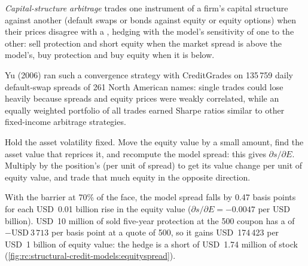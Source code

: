 \begin{definition}\label{def:rc:structural-credit-models:csa}
\emph{Capital-structure arbitrage} trades one
instrument of a firm's capital structure against another (default swaps or bonds
against equity or equity options) when their prices disagree with a ,
hedging with the model's sensitivity of one to the other: sell protection and short
equity when the market spread is above the model's, buy protection and buy equity when
it is below.
\end{definition}
Yu (2006) ran such a convergence strategy with CreditGrades on 135\,759 daily default-swap spreads of 261
North American names: single trades could lose heavily because spreads and equity prices were weakly
correlated, while an equally weighted portfolio of all trades earned Sharpe ratios similar to other
fixed-income arbitrage strategies.


\begin{method}\label{met:rc:structural-credit-models:hedge}
Hold the asset volatility fixed. Move the equity value by a small amount, find the asset
value that reprices it, and recompute the model spread: this gives $\partial s/\partial E$.
Multiply by the position's  (per unit of spread) to get its value change per unit of
equity value, and trade that much equity in the opposite direction.
\end{method}

\begin{example}\label{ex:rc:structural-credit-models:hedge}
With the barrier at 70\% of the face, the model spread falls by 0.47 basis points for
each USD~0.01 billion rise in the equity value ($\partial s/\partial E = -0.0047$ per USD
billion). USD~10 million of sold five-year protection at the 500 coupon has a  of
$-\text{USD}~3\,713$ per basis point at a quote of 500, so it gains USD~174\,423 per USD~1
billion of equity value: the hedge is a short of USD~1.74 million of stock
(\cref{fig:rc:structural-credit-models:equityspread}).
\end{example}

